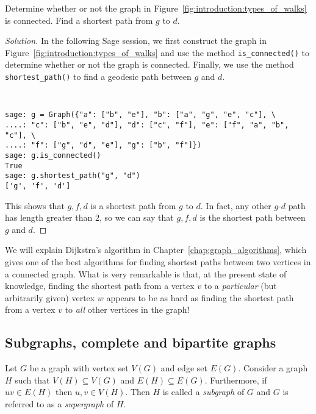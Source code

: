 \begin{example}
Determine whether or not the graph in
Figure~\ref{fig:introduction:types_of_walks} is connected. Find a
shortest path from $g$ to $d$.
\end{example}

\begin{proof}[Solution]
In the following Sage session, we first construct the graph in
Figure~\ref{fig:introduction:types_of_walks} and use the method
\verb!is_connected()! to determine whether or not the graph is
connected. Finally, we use the method \verb!shortest_path()! to find
a geodesic path between $g$ and $d$.
%
\begin{center}
\fontsize{9pt}{9pt}
\selectfont
\tt
\begin{lstlisting}
sage: g = Graph({"a": ["b", "e"], "b": ["a", "g", "e", "c"], \
....: "c": ["b", "e", "d"], "d": ["c", "f"], "e": ["f", "a", "b", "c"], \
....: "f": ["g", "d", "e"], "g": ["b", "f"]})
sage: g.is_connected()
True
sage: g.shortest_path("g", "d")
['g', 'f', 'd']
\end{lstlisting}
\end{center}
%
This shows that $g, f, d$ is a shortest path from $g$ to $d$. In fact,
any other $g$-$d$ path has length greater than $2$, so we can say that
$g, f, d$ is the shortest path between $g$ and $d$.
\end{proof}

We will explain Dijkstra's algorithm in
Chapter~\ref{chap:graph_algorithms}, which gives one of the best
algorithms for finding shortest paths between two vertices in a
connected graph. What is very remarkable is that, at the present state
of knowledge, finding the shortest path from a vertex $v$ to a
\emph{particular} (but arbitrarily given) vertex $w$ appears to be as
hard as finding the shortest path from a vertex $v$ to \emph{all}
other vertices in the graph!
\index{Dijkstra's algorithm}



\subsection{Subgraphs, complete and bipartite graphs}

\begin{definition}
Let $G$ be a graph with vertex set $V(G)$ and edge set
$E(G)$. Consider a graph $H$ such that $V(H) \subseteq V(G)$ and $E(H)
\subseteq E(G)$. Furthermore, if $uv \in E(H)$ then $u,v \in
V(H)$. Then $H$ is called a \emph{subgraph} of $G$ and $G$ is referred
to as a \emph{supergraph} of $H$.
\end{definition}

